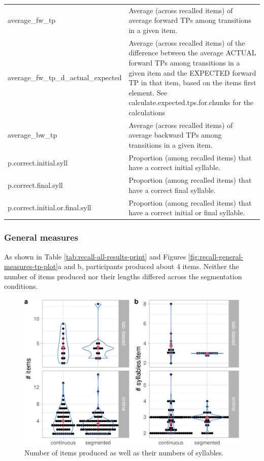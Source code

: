 \documentclass[
]{article}
\begin{document}
\begin{longtable}[t]{l>{\raggedright\arraybackslash}p{30em}}
average\_fw\_tp & Average (across recalled items) of average forward TPs among transitions in a given item.\\
average\_fw\_tp\_d\_actual\_expected & Average (across recalled items) of the difference between the average ACTUAL forward TPs among transitions in a given item and the EXPECTED forward TP in that item, based on the items first element. See calculate.expected.tps.for.chunks for the calculations\\
average\_bw\_tp & Average (across recalled items) of average backward TPs among transitions in a given item.\\
\addlinespace
p.correct.initial.syll & Proportion (among recalled items) that have a correct initial syllable.\\
p.correct.final.syll & Proportion (among recalled items) that have a correct final syllable.\\
p.correct.initial.or.final.syll & Proportion (among recalled items) that have a correct initial or final syllable.\\
\bottomrule
\end{longtable}

\subsubsection{General measures}\label{general-measures}

As shown in Table \ref{tab:recall-all-results-print} and Figures
\ref{fig:recall-general-measures-tp-plot}a and b, participants produced
about 4 items. Neither the number of items produced nor their lengths
differed across the segmentation conditions.

\begin{figure}

{\centering \includegraphics[width=0.8\linewidth]{segmentation_recall_combined_for_revision3_files/figure-latex/recall-general-measures-plot-1} 

}

\caption{Number of items produced as well as their numbers of syllables.}\label{fig:recall-general-measures-plot}
\end{figure}
\end{document}

